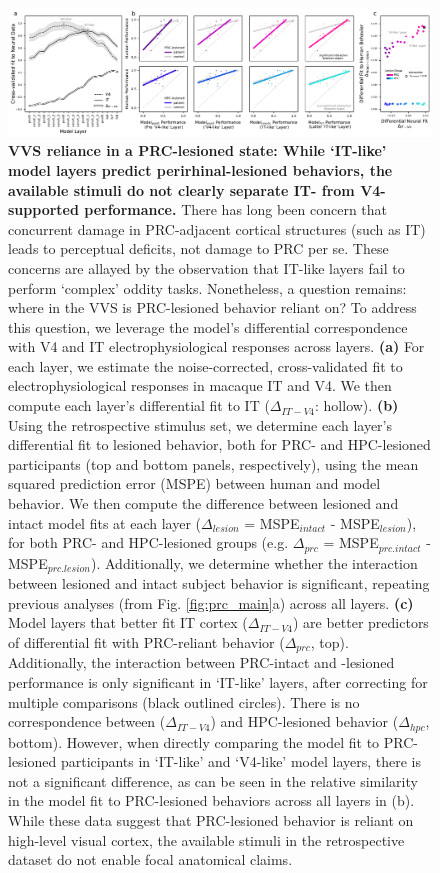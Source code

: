 \documentclass[11pt]{article}
\begin{document}
\begin{figure}[ht]
\centering
\includegraphics[width=\linewidth]{figures/F3}
\caption{\textbf{VVS reliance in a PRC-lesioned state: While `IT-like' model layers predict perirhinal-lesioned behaviors, the available stimuli do not clearly separate IT- from V4-supported performance.} There has long been concern that concurrent damage in PRC-adjacent cortical structures (such as IT) leads to perceptual deficits, not damage to PRC per se. These concerns are allayed by the observation that IT-like layers fail to perform `complex’ oddity tasks. Nonetheless, a question remains: where in the VVS is PRC-lesioned behavior reliant on? To address this question, we leverage the model's differential correspondence with V4 and IT electrophysiological responses across layers. \textbf{(a)} For each layer, we estimate the noise-corrected, cross-validated fit to electrophysiological responses in macaque IT and V4. We then compute each layer's differential fit to IT ($\Delta_{IT-V4}$: hollow). \textbf{(b)} Using the retrospective stimulus set, we determine each layer's differential fit to lesioned behavior, both for PRC- and HPC-lesioned participants (top and bottom panels, respectively), using the mean squared prediction error (MSPE) between human and model behavior. We then compute the difference between lesioned and intact model fits at each layer ($\Delta_{lesion}$ = MSPE$_{intact}$ - MSPE$_{lesion}$), for both PRC- and HPC-lesioned groups (e.g. $\Delta_{prc}$ = MSPE$_{prc.intact}$ - MSPE$_{prc.lesion}$). Additionally, we determine whether the interaction between lesioned and intact subject behavior is significant, repeating previous analyses (from Fig. \ref{fig:prc_main}a) across all layers. \textbf{(c)} Model layers that better fit IT cortex ($\Delta_{IT-V4}$) are better predictors of differential fit with PRC-reliant behavior ($\Delta_{prc}$, top). Additionally, the interaction between PRC-intact and -lesioned performance is only significant in `IT-like' layers, after correcting for multiple comparisons (black outlined circles). There is no correspondence between ($\Delta_{IT-V4}$) and HPC-lesioned behavior ($\Delta_{hpc}$, bottom). However, when directly comparing the model fit to PRC-lesioned participants in `IT-like' and `V4-like' model layers, there is not a significant difference, as can be seen in the relative similarity in the model fit to PRC-lesioned behaviors across all layers in (b). While these data suggest that PRC-lesioned behavior is reliant on high-level visual cortex, the available stimuli in the retrospective dataset do not enable focal anatomical claims.}
\label{fig:vvs_reliance}
\end{figure}
\end{document}
